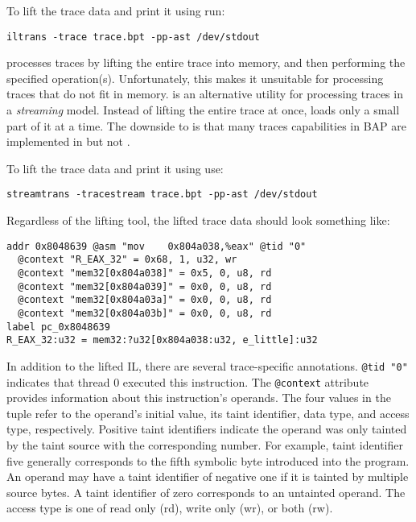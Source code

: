 To lift the trace data and print it using  run:

\begin{verbatim}
iltrans -trace trace.bpt -pp-ast /dev/stdout
\end{verbatim}

 processes traces by lifting the entire trace into
memory, and then performing the specified operation(s).
Unfortunately, this makes it unsuitable for processing traces that do
not fit in memory.   is an alternative utility
for processing traces in a \emph{streaming} model.  Instead of lifting
the entire trace at once,  loads only a small
part of it at a time.  The downside to  is that
many traces capabilities in BAP are implemented in 
but not .

To lift the trace data and print it using  use:

\begin{verbatim}
streamtrans -tracestream trace.bpt -pp-ast /dev/stdout
\end{verbatim}

Regardless of the lifting tool, the lifted trace data should look
something like:

\begin{verbatim}
addr 0x8048639 @asm "mov    0x804a038,%eax" @tid "0"
  @context "R_EAX_32" = 0x68, 1, u32, wr
  @context "mem32[0x804a038]" = 0x5, 0, u8, rd
  @context "mem32[0x804a039]" = 0x0, 0, u8, rd
  @context "mem32[0x804a03a]" = 0x0, 0, u8, rd
  @context "mem32[0x804a03b]" = 0x0, 0, u8, rd
label pc_0x8048639
R_EAX_32:u32 = mem32:?u32[0x804a038:u32, e_little]:u32
\end{verbatim}

In addition to the lifted IL, there are several trace-specific
annotations.  \texttt{@tid "0"} indicates that thread 0 executed this
instruction.  The \texttt{@context} attribute provides information
about this instruction's operands.  The four values in the tuple refer
to the operand's initial value, its taint identifier, data type, and
access type, respectively.  Positive taint identifiers indicate the
operand was only tainted by the taint source with the corresponding
number.  For example, taint identifier five generally corresponds to
the fifth symbolic byte introduced into the program.  An operand may
have a taint identifier of negative one if it is tainted by multiple
source bytes.  A taint identifier of zero corresponds to an untainted
operand.  The access type is one of read only (rd), write only (wr),
or both (rw).

